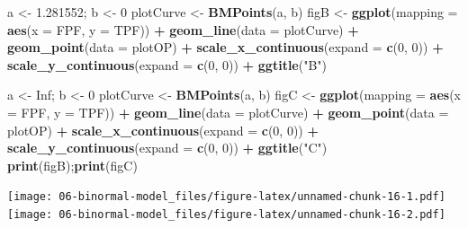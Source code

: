 \documentclass[
]{book}
\newenvironment{Shaded}{\begin{snugshade}}{\end{snugshade}}
\newcommand{\DataTypeTok}[1]{\textcolor[rgb]{0.13,0.29,0.53}{#1}}
\newcommand{\DecValTok}[1]{\textcolor[rgb]{0.00,0.00,0.81}{#1}}
\newcommand{\FloatTok}[1]{\textcolor[rgb]{0.00,0.00,0.81}{#1}}
\newcommand{\KeywordTok}[1]{\textcolor[rgb]{0.13,0.29,0.53}{\textbf{#1}}}
\newcommand{\NormalTok}[1]{#1}
\newcommand{\OperatorTok}[1]{\textcolor[rgb]{0.81,0.36,0.00}{\textbf{#1}}}
\newcommand{\OtherTok}[1]{\textcolor[rgb]{0.56,0.35,0.01}{#1}}
\newcommand{\StringTok}[1]{\textcolor[rgb]{0.31,0.60,0.02}{#1}}
\begin{document}
\begin{Shaded}
\begin{Highlighting}[]
\NormalTok{a <-}\StringTok{ }\FloatTok{1.281552}\NormalTok{; b <-}\StringTok{ }\DecValTok{0}
\NormalTok{plotCurve <-}\StringTok{ }\KeywordTok{BMPoints}\NormalTok{(a, b)}
\NormalTok{figB <-}\StringTok{ }\KeywordTok{ggplot}\NormalTok{(}\DataTypeTok{mapping =} \KeywordTok{aes}\NormalTok{(}\DataTypeTok{x =}\NormalTok{ FPF, }\DataTypeTok{y =}\NormalTok{ TPF)) }\OperatorTok{+}\StringTok{ }
\StringTok{  }\KeywordTok{geom_line}\NormalTok{(}\DataTypeTok{data =}\NormalTok{ plotCurve) }\OperatorTok{+}\StringTok{ }
\StringTok{  }\KeywordTok{geom_point}\NormalTok{(}\DataTypeTok{data =}\NormalTok{ plotOP)  }\OperatorTok{+}\StringTok{ }
\StringTok{  }\KeywordTok{scale_x_continuous}\NormalTok{(}\DataTypeTok{expand =} \KeywordTok{c}\NormalTok{(}\DecValTok{0}\NormalTok{, }\DecValTok{0}\NormalTok{)) }\OperatorTok{+}\StringTok{ }
\StringTok{  }\KeywordTok{scale_y_continuous}\NormalTok{(}\DataTypeTok{expand =} \KeywordTok{c}\NormalTok{(}\DecValTok{0}\NormalTok{, }\DecValTok{0}\NormalTok{)) }\OperatorTok{+}
\StringTok{  }\KeywordTok{ggtitle}\NormalTok{(}\StringTok{"B"}\NormalTok{)}

\NormalTok{a <-}\StringTok{ }\OtherTok{Inf}\NormalTok{; b <-}\StringTok{ }\DecValTok{0}
\NormalTok{plotCurve <-}\StringTok{ }\KeywordTok{BMPoints}\NormalTok{(a, b)}
\NormalTok{figC <-}\StringTok{ }\KeywordTok{ggplot}\NormalTok{(}\DataTypeTok{mapping =} \KeywordTok{aes}\NormalTok{(}\DataTypeTok{x =}\NormalTok{ FPF, }\DataTypeTok{y =}\NormalTok{ TPF)) }\OperatorTok{+}\StringTok{ }
\StringTok{  }\KeywordTok{geom_line}\NormalTok{(}\DataTypeTok{data =}\NormalTok{ plotCurve) }\OperatorTok{+}\StringTok{ }
\StringTok{  }\KeywordTok{geom_point}\NormalTok{(}\DataTypeTok{data =}\NormalTok{ plotOP)  }\OperatorTok{+}\StringTok{ }
\StringTok{  }\KeywordTok{scale_x_continuous}\NormalTok{(}\DataTypeTok{expand =} \KeywordTok{c}\NormalTok{(}\DecValTok{0}\NormalTok{, }\DecValTok{0}\NormalTok{)) }\OperatorTok{+}\StringTok{ }
\StringTok{  }\KeywordTok{scale_y_continuous}\NormalTok{(}\DataTypeTok{expand =} \KeywordTok{c}\NormalTok{(}\DecValTok{0}\NormalTok{, }\DecValTok{0}\NormalTok{)) }\OperatorTok{+}
\StringTok{  }\KeywordTok{ggtitle}\NormalTok{(}\StringTok{"C"}\NormalTok{)}
\KeywordTok{print}\NormalTok{(figB);}\KeywordTok{print}\NormalTok{(figC)}
\end{Highlighting}
\end{Shaded}

\texttt{[image: 06-binormal-model\_files/figure-latex/unnamed-chunk-16-1.pdf]} \texttt{[image: 06-binormal-model\_files/figure-latex/unnamed-chunk-16-2.pdf]}
\end{document}
